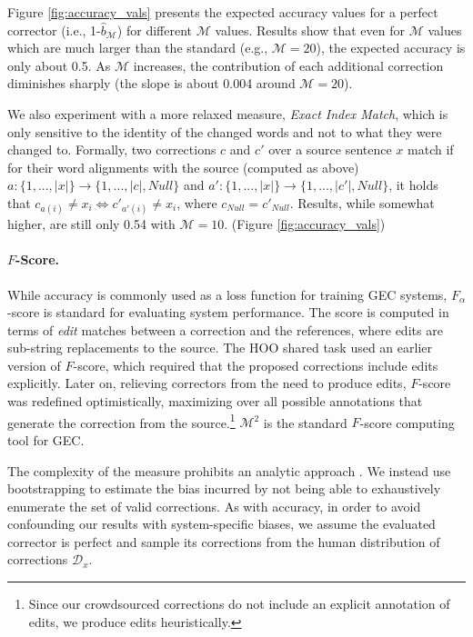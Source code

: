 \documentclass[letterpaper, 11pt]{article}
\newcommand{\lc}[1]{}
\begin{document}
Figure \ref{fig:accuracy_vals} presents the expected accuracy values for a perfect
corrector (i.e., 1-$\hat{b}_\mathcal{M}$) for different  $\mathcal{M}$ values. 
Results show that even for $\mathcal{M}$ values which are much larger than the standard (e.g., $\mathcal{M}=20$),
the expected accuracy is only about 0.5. As $\mathcal{M}$ increases, the contribution of each additional correction 
diminishes sharply (the slope is about 0.004 around $\mathcal{M}=20$).

We also experiment with a more relaxed measure, {\it Exact Index Match}, which is only sensitive to the identity of the changed words and not to what they were changed to. 
Formally, two corrections $c$ and $c'$ over a source sentence $x$ match if for their word alignments with the source (computed as above) $a:\{1,...,\left|x\right|\} \rightarrow \{1,...,\left|c\right|,Null\}$
and $a':\{1,...,\left|x\right|\} \rightarrow \{1,...,\left|c'\right|,Null\}$, it holds that $c_{a\left(i\right)} \neq x_{i} \Leftrightarrow c'_{a'\left(i\right)} \neq x_{i}$, where $c_{Null}=c'_{Null}$.
Results, while somewhat higher, are still only 0.54 with $\mathcal{M}=10$. (Figure \ref{fig:accuracy_vals})


\paragraph{$F$-Score.}
While accuracy is commonly used as a loss function for training GEC systems,
$F_\alpha$-score is standard for evaluating system performance.\lc{Do we really need to elaborate on F score history in GEC? OA: I think it's fine as is}
The score is computed in terms of {\it edit} matches between a correction and the references, where edits are sub-string replacements to the source.
The HOO shared task used an earlier version of $F$-score, which required that the proposed corrections include edits explicitly.
Later on, relieving correctors from the need to produce edits, $F$-score was redefined optimistically, maximizing over all possible annotations that generate the correction from the source.\footnote{Since our crowdsourced corrections
	do not include an explicit annotation of edits, we produce edits heuristically.}
$\mathcal{M}^2$ \cite{dahlmeier2012better} is the standard $F$-score computing tool for GEC.

The complexity of the measure prohibits an analytic approach \cite{yeh2000more}.
We instead use bootstrapping to estimate the bias incurred by not being able to exhaustively enumerate the set of valid corrections.
As with accuracy, in order to avoid confounding our results with system-specific biases,
we assume the evaluated corrector is perfect and sample its corrections from the human distribution of corrections $\mathcal{D}_x$.
\end{document}
